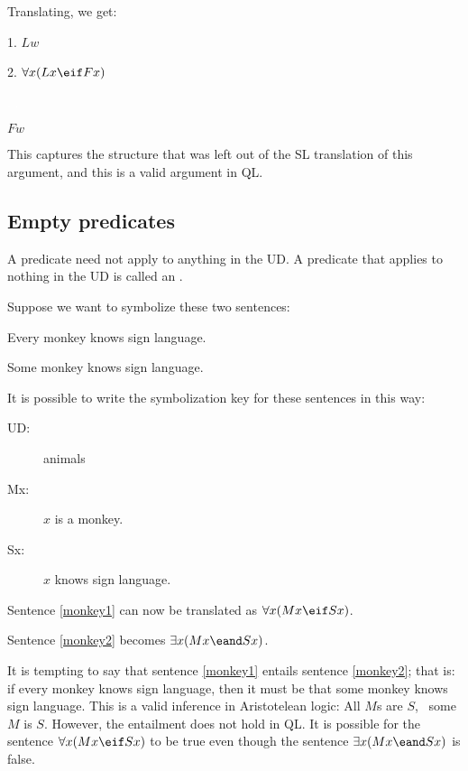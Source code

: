 Translating, we get:

\begin{kormanize}
\item[1.] $Lw$
\item[2.] $\forall x(Lx \eif Fx)$
\item[] \textcolor{white}{.}\sout{\hspace{.2\linewidth}} \textcolor{white}{.} 
\item[\therefore] $Fw$
\end{kormanize}

This captures the structure that was left out of the SL translation of this argument, and this is a valid argument in QL.


\subsection{Empty predicates}

A predicate need not apply to anything in the UD. A predicate that applies to nothing in the UD is called an .

Suppose we want to symbolize these two sentences:
\begin{kormanize}
\item[\ex{monkey1}]Every monkey knows sign language.
\item[\ex{monkey2}]Some monkey knows sign language.
\end{kormanize}
It is possible to write the symbolization key for these sentences in this way:
\begin{description}
\item[UD:] animals
\item[Mx:] $x$ is a monkey.
\item[Sx:] $x$ knows sign language.
\end{description}

Sentence \ref{monkey1} can now be translated as $\forall x(Mx \eif Sx)$.

Sentence \ref{monkey2} becomes $\exists x(Mx \eand Sx)$.

It is tempting to say that sentence \ref{monkey1} entails sentence \ref{monkey2}; that is: if every monkey knows sign language, then it must be that some monkey knows sign language. This is a valid inference in Aristotelean logic: All $M$s are $S$, \therefore\ some $M$ is $S$. However, the entailment does not hold in QL. It is possible for the sentence $\forall x(Mx \eif Sx)$ to be true even though the sentence $\exists x(Mx \eand Sx)$ is false.

